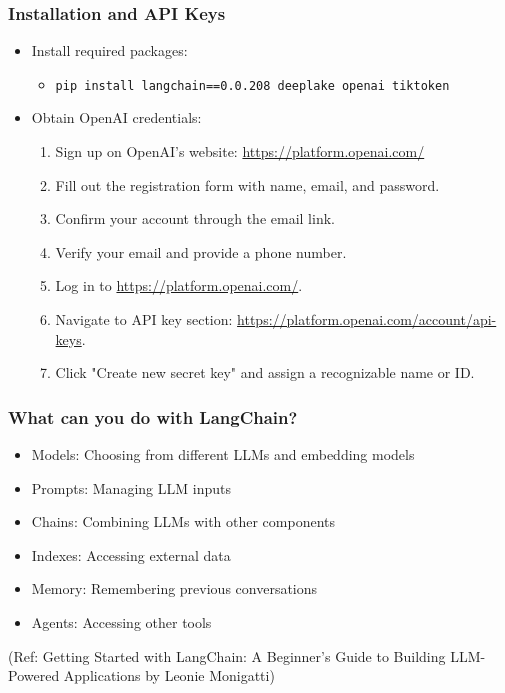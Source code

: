 \begin{frame}
\frametitle{Installation and API Keys}

\begin{itemize}
    \item Install required packages:
    \begin{itemize}
        \item \texttt{pip install langchain==0.0.208 deeplake openai tiktoken}
    \end{itemize}
    \item Obtain OpenAI credentials:
    \begin{enumerate}
        \item Sign up on OpenAI's website: \url{https://platform.openai.com/}
        \item Fill out the registration form with name, email, and password.
        \item Confirm your account through the email link.
        \item Verify your email and provide a phone number.
        \item Log in to \url{https://platform.openai.com/}.
        \item Navigate to API key section: \url{https://platform.openai.com/account/api-keys}.
        \item Click "Create new secret key" and assign a recognizable name or ID.
    \end{enumerate}
\end{itemize}

\end{frame}


\begin{frame}[fragile]\frametitle{What can you do with LangChain?}

\begin{itemize}
\item Models: Choosing from different LLMs and embedding models
\item Prompts: Managing LLM inputs
\item Chains: Combining LLMs with other components
\item Indexes: Accessing external data
\item Memory: Remembering previous conversations
\item Agents: Accessing other tools
\end{itemize}

{\tiny (Ref: Getting Started with LangChain: A Beginner’s Guide to Building LLM-Powered Applications by Leonie Monigatti)}

\end{frame}

